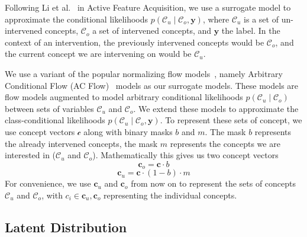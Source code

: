 Following Li et al.~\cite{afa} in Active Feature Acquisition,
we use a surrogate model 
to approximate
the conditional likelihoods $p(\mathcal{C}_u \mid \mathcal{C}_o, \mathbf{y})$, 
where $\mathcal{C}_u$ is a set of un-intervened
concepts, $\mathcal{C}_o$ a set of intervened concepts,
and $\mathbf{y}$ the label. 
In the context of an intervention, the previously intervened concepts would be $\mathcal{C}_o$,
and the current concept we are intervening on would be
$\mathcal{C}_u$.

We use a variant of the popular normalizing flow models~\cite{normalizing-flows},
namely Arbitrary Conditional Flow (AC Flow)~\cite{acflow}
models as our surrogate models.
These models are 
flow models augmented to model arbitrary conditional likelihoods $p(\mathcal{C}_u \mid \mathcal{C}_o)$
between sets of variables $\mathcal{C}_u$ and $\mathcal{C}_o$.
We extend these models to approximate the class-conditional
likelihoods
$p(\mathcal{C}_u \mid \mathcal{C}_o, \mathbf{y})$. To represent
these sets of concept,
we use concept vectors $\mathcal{c}$ along with
binary masks $b$ and $m$.
The mask $b$ represents
the already intervened concepts, the mask $m$ represents
the concepts we are interested in ($\mathcal{C}_u$ and $\mathcal{C}_o$).
Mathematically this gives us two concept vectors
\[\mathbf{c}_o = \mathbf{c} \cdot b\]
\[\mathbf{c}_u = \mathbf{c} \cdot (1 - b) \cdot m\]
For convenience, we use $\mathbf{c}_u$ and $\mathbf{c}_o$ from now on
to represent the sets of concepts $\mathcal{C}_u$ and $\mathcal{C}_o$, with
$c_i \in \mathbf{c}_u, \mathbf{c}_o$ representing the individual concepts.

\subsection{Latent Distribution}

